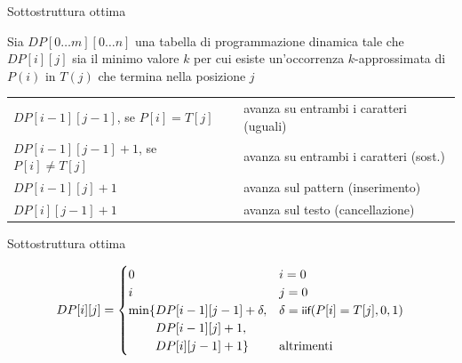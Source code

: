 \begin{frame}{Sottostruttura ottima}

\vspace{-6pt}
\begin{myboxtitle}[Definizione]
Sia $DP[0 \ldots m][0 \ldots n]$ una tabella di programmazione dinamica
tale che \alert{$DP[i][j]$ sia il minimo valore $k$ per cui esiste un'occorrenza $k$-approssimata di $P(i)$ in $T(j)$ che termina nella posizione $j$}
\end{myboxtitle}

\pause
{}
\small
\smallskip
\begin{tabular}{ll}
$DP[i-1][j-1]$, se $P[i] = T[j]$ &	avanza su entrambi i caratteri (uguali) \\
$DP[i-1][j-1]+1$, se $P[i] \neq T[j]$ &	avanza su entrambi i caratteri  (\alert{sost.}) \\
$DP[i-1][j]+1$				& avanza sul pattern (\alert{inserimento})\\
$DP[i][j-1]+1$				& avanza sul testo (\alert{cancellazione})\\
\end{tabular}

\end{frame}

\begin{frame}{Sottostruttura ottima}

\vspace{-6pt}
\[
DP[i][j] = \begin{cases}
0  & \textrm{$i=0$}\\
i  & \textrm{$j=0$}\\
\min\{ DP[i-1][j-1] + \delta, & \delta = \textsf{{\small iif}}(P[i]=T[j],0,1)\\
\qquad\, DP[i-1][j] + 1,\\ 
\qquad\, DP[i][j-1] + 1\} & \textrm{altrimenti}
\end{cases}
\]

\begin{center}
\end{center}

\end{frame}

